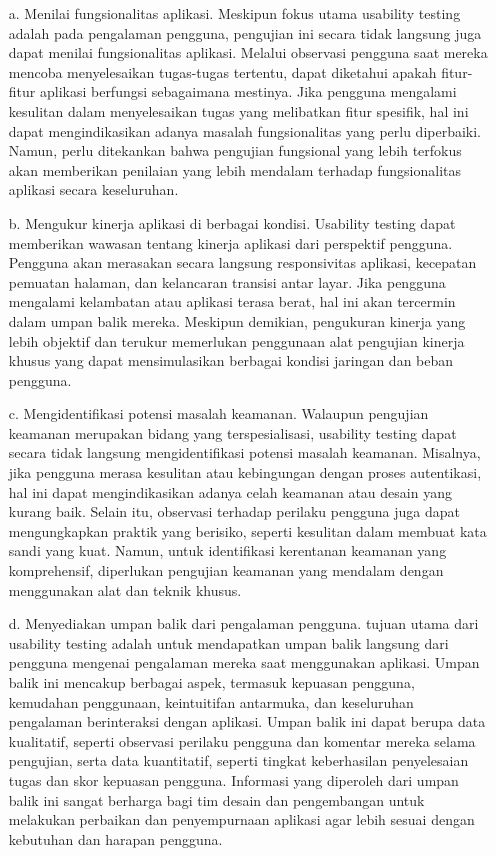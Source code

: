 \begin{itemize}[leftmargin=*]
\item[a.] Menilai fungsionalitas aplikasi. Meskipun fokus utama usability testing adalah pada pengalaman pengguna, pengujian ini secara tidak langsung juga dapat menilai fungsionalitas aplikasi. Melalui observasi pengguna saat mereka mencoba menyelesaikan tugas-tugas tertentu, dapat diketahui apakah fitur-fitur aplikasi berfungsi sebagaimana mestinya. Jika pengguna mengalami kesulitan dalam menyelesaikan tugas yang melibatkan fitur spesifik, hal ini dapat mengindikasikan adanya masalah fungsionalitas yang perlu diperbaiki. Namun, perlu ditekankan bahwa pengujian fungsional yang lebih terfokus akan memberikan penilaian yang lebih mendalam terhadap fungsionalitas aplikasi secara keseluruhan.
\item[b.] Mengukur kinerja aplikasi di berbagai kondisi. Usability testing dapat memberikan wawasan tentang kinerja aplikasi dari perspektif pengguna. Pengguna akan merasakan secara langsung responsivitas aplikasi, kecepatan pemuatan halaman, dan kelancaran transisi antar layar. Jika pengguna mengalami kelambatan atau aplikasi terasa berat, hal ini akan tercermin dalam umpan balik mereka. Meskipun demikian, pengukuran kinerja yang lebih objektif dan terukur memerlukan penggunaan alat pengujian kinerja khusus yang dapat mensimulasikan berbagai kondisi jaringan dan beban pengguna.
\item[c.] Mengidentifikasi potensi masalah keamanan. Walaupun pengujian keamanan merupakan bidang yang terspesialisasi, usability testing dapat secara tidak langsung mengidentifikasi potensi masalah keamanan. Misalnya, jika pengguna merasa kesulitan atau kebingungan dengan proses autentikasi, hal ini dapat mengindikasikan adanya celah keamanan atau desain yang kurang baik. Selain itu, observasi terhadap perilaku pengguna juga dapat mengungkapkan praktik yang berisiko, seperti kesulitan dalam membuat kata sandi yang kuat. Namun, untuk identifikasi kerentanan keamanan yang komprehensif, diperlukan pengujian keamanan yang mendalam dengan menggunakan alat dan teknik khusus.
\item[d.] Menyediakan umpan balik dari pengalaman pengguna. tujuan utama dari usability testing adalah untuk mendapatkan umpan balik langsung dari pengguna mengenai pengalaman mereka saat menggunakan aplikasi. Umpan balik ini mencakup berbagai aspek, termasuk kepuasan pengguna, kemudahan penggunaan, keintuitifan antarmuka, dan keseluruhan pengalaman berinteraksi dengan aplikasi. Umpan balik ini dapat berupa data kualitatif, seperti observasi perilaku pengguna dan komentar mereka selama pengujian, serta data kuantitatif, seperti tingkat keberhasilan penyelesaian tugas dan skor kepuasan pengguna. Informasi yang diperoleh dari umpan balik ini sangat berharga bagi tim desain dan pengembangan untuk melakukan perbaikan dan penyempurnaan aplikasi agar lebih sesuai dengan kebutuhan dan harapan pengguna.
\end{itemize}

